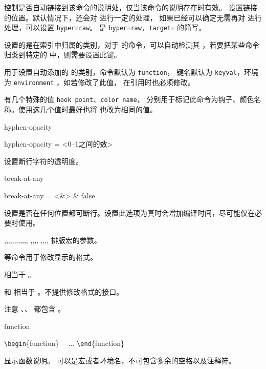 \documentclass{whudoc}
\begin{document}
 控制是否自动链接到该命令的说明处，仅当该命令的说明存在时有效。
 设置链接的位置。默认情况下，还会对  进行一定的处理，
如果已经可以确定无需再对  进行处理，可以设置 \verb|hyper=raw|。
 是 \verb|hyper=raw, target=| 的简写。

 设置的是在索引中归属的类别，对于 \LaTeXiii 的命令，可以自动检测其 
，若要把某些命令归类到特定的  中，则需要设置此键。

 用于设置自动添加的  的类别，命令默认为 \texttt{function}，
键名默认为 \texttt{keyval}，环境为 \texttt{environment} ，如若修改了此值，
在引用时也必须修改。

 有几个特殊的值 \verb*|hook point|、\verb*|color name|，
分别用于标记此命令为钩子、颜色名称。使用这几个值时最好也将  也改为相同的值。

\begin{keyval}[path=doc/cmd]{hyphen-opacity}
  \begin{syntax}
    hyphen-opacity = <{0--1之间的数}>
  \end{syntax}
设置断行字符的透明度。
\end{keyval}

\begin{keyval}[path=doc/cmd]{break-at-any}
  \begin{syntax}
    break-at-any = <&\TTF> & false 
  \end{syntax}
设置是否在任何位置都可断行。设置此选项为真时会增加编译时间，尽可能仅在必要时使用。
\end{keyval}

\begin{function}{\meta,\veta,\marg,\Arg,\oarg,\parg,\pkg,\env,\cls,\opt,\file,\docfile,
  \whu@doc@meta@format,\whu@doc@veta@format,\whu@doc@marg@format,\whu@doc@oarg@format,
  \whu@doc@parg@format,\whu@doc@pkg@format,\whu@doc@env@format,\whu@doc@cls@format,\whu@doc@opt@format} 
排版宏的参数。

 等命令用于修改显示的格式。

 相当于 。

 和  相当于 。不提供修改格式的接口。

注意 、、 都包含 。
\end{function}

\begin{function}[type=environment]{function}
\begin{syntax}
  \verb|\begin|\{function\}  
  ~~... 
  \verb|\end|\{function\}
\end{syntax}
显示函数说明。 可以是宏或者环境名，不可包含多余的空格以及注释符。
\end{function}
\end{document}
